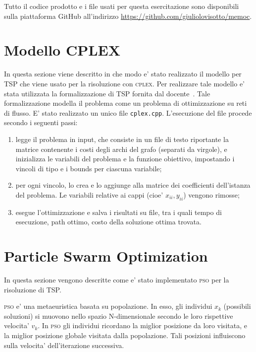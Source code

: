 \documentclass[
12pt, %
a4paper, %
oneside, %
headinclude,footinclude, %
BCOR5mm, %
]{scrartcl}
\begin{document}
Tutto il codice prodotto e i file usati per questa esercitazione sono disponibili sulla piattaforma GitHub all'indirizzo \url{https://github.com/giuliolovisotto/memoc}.

\section{Modello CPLEX} \label{sec:cplex}

In questa sezione viene descritto in che modo e' stato realizzato il modello per TSP che viene usato per la risoluzione con \textsc{cplex}. Per realizzare tale modello e' stata utilizzata la formalizzazione di TSP fornita dal docente~\cite{luigitraccia1}. Tale formalizzazione modella il problema come un problema di ottimizzazione su reti di flusso. E' stato realizzato un unico file \texttt{cplex.cpp}. L'esecuzione del file procede secondo i seguenti passi:
\begin{enumerate}
 \item legge il problema in input, che consiste in un file di testo riportante la matrice contenente i costi degli archi del grafo (separati da virgole), e inizializza le variabili del problema e la funzione obiettivo, impostando i vincoli di tipo e i bounds per ciascuna variabile;
 \item per ogni vincolo, lo crea e lo aggiunge alla matrice dei coefficienti dell'istanza del problema. Le variabili relative ai cappi (cioe' $x_{ii}, y_{ii}$) vengono rimosse;
 \item esegue l'ottimizzazione e salva i risultati su file, tra i quali tempo di esecuzione, path ottimo, costo della soluzione ottima trovata.
\end{enumerate}


\section{Particle Swarm Optimization} \label{sec:eur}
In questa sezione vengono descritte come e' stato implementato \textsc{pso} per la risoluzione di TSP. 

\textsc{pso} e' una metaeuristica basata su popolazione. In esso, gli individui $x_k$ (possibili soluzioni) si muovono nello spazio N-dimensionale secondo le loro rispettive velocita' $v_k$. In \textsc{pso} gli individui ricordano la miglior posizione da loro visitata, e la miglior posizione globale visitata dalla popolazione. Tali posizioni influiscono sulla velocita' dell'iterazione successiva. 
\end{document}
